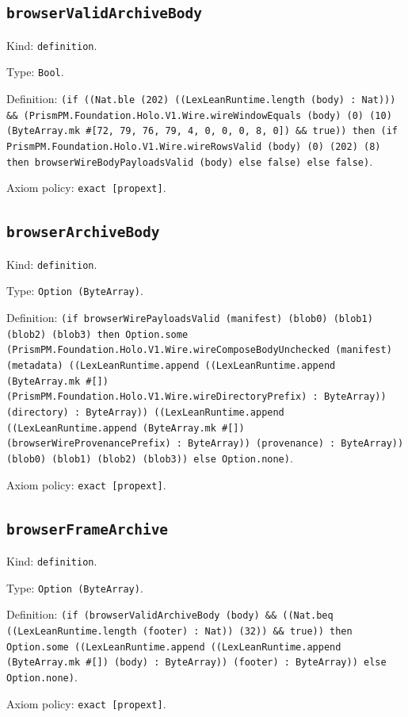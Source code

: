 \documentclass[11pt]{article}
\begin{document}
\subsection*{\texttt{browserValidArchiveBody}}
\noindent Kind: \texttt{definition}.\par
\noindent Type: \texttt{Bool}.\par
\noindent Definition: \texttt{(if ((Nat.ble (202) ((LexLeanRuntime.length (body) : Nat))) \&\& (PrismPM.Foundation.Holo.V1.Wire.wireWindowEquals (body) (0) (10) (ByteArray.mk \#[72, 79, 76, 79, 4, 0, 0, 0, 8, 0]) \&\& true)) then (if PrismPM.Foundation.Holo.V1.Wire.wireRowsValid (body) (0) (202) (8) then browserWireBodyPayloadsValid (body) else false) else false)}.\par
\noindent Axiom policy: \texttt{exact [propext]}.\par
\subsection*{\texttt{browserArchiveBody}}
\noindent Kind: \texttt{definition}.\par
\noindent Type: \texttt{Option (ByteArray)}.\par
\noindent Definition: \texttt{(if browserWirePayloadsValid (manifest) (blob0) (blob1) (blob2) (blob3) then Option.some (PrismPM.Foundation.Holo.V1.Wire.wireComposeBodyUnchecked (manifest) (metadata) ((LexLeanRuntime.append ((LexLeanRuntime.append (ByteArray.mk \#[]) (PrismPM.Foundation.Holo.V1.Wire.wireDirectoryPrefix) : ByteArray)) (directory) : ByteArray)) ((LexLeanRuntime.append ((LexLeanRuntime.append (ByteArray.mk \#[]) (browserWireProvenancePrefix) : ByteArray)) (provenance) : ByteArray)) (blob0) (blob1) (blob2) (blob3)) else Option.none)}.\par
\noindent Axiom policy: \texttt{exact [propext]}.\par
\subsection*{\texttt{browserFrameArchive}}
\noindent Kind: \texttt{definition}.\par
\noindent Type: \texttt{Option (ByteArray)}.\par
\noindent Definition: \texttt{(if (browserValidArchiveBody (body) \&\& ((Nat.beq ((LexLeanRuntime.length (footer) : Nat)) (32)) \&\& true)) then Option.some ((LexLeanRuntime.append ((LexLeanRuntime.append (ByteArray.mk \#[]) (body) : ByteArray)) (footer) : ByteArray)) else Option.none)}.\par
\noindent Axiom policy: \texttt{exact [propext]}.\par
\end{document}
